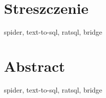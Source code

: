 \section*{Streszczenie}
\vspace{1cm}

\lipsum[9]

\vspace{1cm}
spider, text-to-sql, ratsql, bridge
\clearpage

\section*{Abstract}
\vspace{1cm}

\lipsum[9]

\vspace{1cm}
spider, text-to-sql, ratsql, bridge
\clearpage
